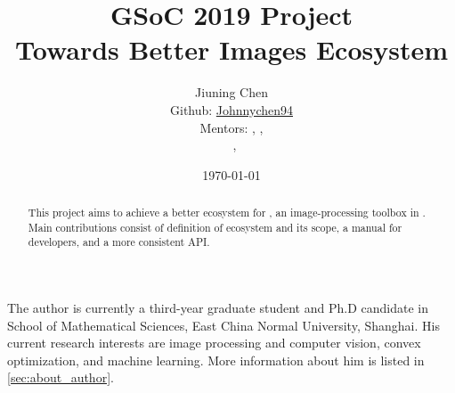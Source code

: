 \documentclass[12pt, a4paper]{article}
\title{GSoC 2019 Project\\Towards Better Images Ecosystem}
\author{Jiuning Chen\mailto{johnnychen94@hotmail.com}\\
Github: \href{https://github.com/johnnychen94}{Johnnychen94}\\
Mentors: \zygmunt, \julio, \\
\ \evizero, \timholy
}
\date{\today}
\begin{document}
\maketitle

\renewcommand\abstractname{Abstract}
\begin{abstract}
    This project aims to achieve a better ecosystem for \href{https://juliaimages.org/latest/}{\images}, an image-processing toolbox in \href{https://julialang.org/}{\langjulia}. Main contributions consist of definition of \images{} ecosystem and its scope, a manual for developers, and a more consistent API.
\end{abstract}

\noindent The author is currently a third-year graduate student and Ph.D candidate in School of Mathematical Sciences, East China Normal University, Shanghai. His current research interests are image processing and computer vision, convex optimization, and machine learning. More information about him is listed in \cref{sec:about_author}.\par






\end{document}
